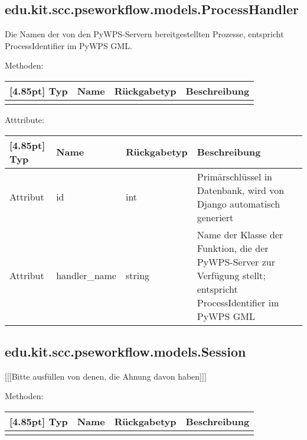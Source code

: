 		\subsection{edu.kit.scc.pseworkflow.models.ProcessHandler}
			Die Namen der von den PyWPS-Servern bereitgestellten Prozesse, entspricht ProcessIdentifier im PyWPS GML.
			
			Methoden:
			\begin{center}
				\setlength\tabcolsep{5pt}
				\renewcommand{\arraystretch}{1.5}
				
				\begin{tabularx}{\textwidth}{|l|l|l|X|}
					\hline
					\rowcolor[gray]{0.75}[4.85pt]
					Typ & Name & Rückgabetyp & Beschreibung \\ \hline 
					&&& \\
					\hline
				\end{tabularx}
			\end{center}
			
			Atttribute:
			\begin{center}
				\setlength\tabcolsep{5pt}
				\renewcommand{\arraystretch}{1.5}
				
				\begin{tabularx}{\textwidth}{|l|l|l|X|}
					\hline
					\rowcolor[gray]{0.75}[4.85pt]
					Typ & Name & Rückgabetyp & Beschreibung \\ \hline 
					Attribut & id & int & Primärschlüssel in Datenbank, wird von Django automatisch generiert \\ \hline
					Attribut & handler\_name & string & Name der Klasse der Funktion, die der PyWPS-Server zur Verfügung stellt; entspricht ProcessIdentifier im PyWPS GML \\
					\hline
				\end{tabularx}
			\end{center}
		
		
		\subsection{edu.kit.scc.pseworkflow.models.Session}
			[[[Bitte ausfüllen von denen, die Ahnung davon haben]]]
			
			Methoden:
			\begin{center}
				\setlength\tabcolsep{5pt}
				\renewcommand{\arraystretch}{1.5}
				
				\begin{tabularx}{\textwidth}{|l|l|l|X|}
					\hline
					\rowcolor[gray]{0.75}[4.85pt]
					Typ & Name & Rückgabetyp & Beschreibung \\ \hline 
					&&& \\
					\hline
				\end{tabularx}
			\end{center}
			
